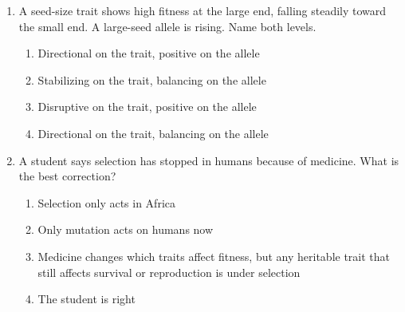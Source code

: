 \documentclass[11pt]{article}
\begin{document}
\begin{enumerate}[label=\textbf{\arabic*.}, leftmargin=2em, itemsep=1.4em]
\begin{enumerate}[label={}, leftmargin=2.4em, labelwidth=0pt, itemsep=2pt, topsep=0pt]
\item \hspace*{-2.4em}Heterozygote advantage
\item \hspace*{-2.4em}Complete dominance
\end{enumerate}
\item A seed-size trait shows high fitness at the large end, falling steadily toward the small end. A large-seed allele is rising. Name both levels.
\par\smallskip
\begin{enumerate}[label={}, leftmargin=2.4em, labelwidth=0pt, itemsep=2pt, topsep=0pt]
\item \hspace*{-2.4em}Directional on the trait, positive on the allele
\item \hspace*{-2.4em}Stabilizing on the trait, balancing on the allele
\item \hspace*{-2.4em}Disruptive on the trait, positive on the allele
\item \hspace*{-2.4em}Directional on the trait, balancing on the allele
\end{enumerate}
\item A student says selection has stopped in humans because of medicine. What is the best correction?
\par\smallskip
\begin{enumerate}[label={}, leftmargin=2.4em, labelwidth=0pt, itemsep=2pt, topsep=0pt]
\item \hspace*{-2.4em}Selection only acts in Africa
\item \hspace*{-2.4em}Only mutation acts on humans now
\item \hspace*{-2.4em}Medicine changes which traits affect fitness, but any heritable trait that still affects survival or reproduction is under selection
\item \hspace*{-2.4em}The student is right
\end{enumerate}
\end{enumerate}
\end{document}
